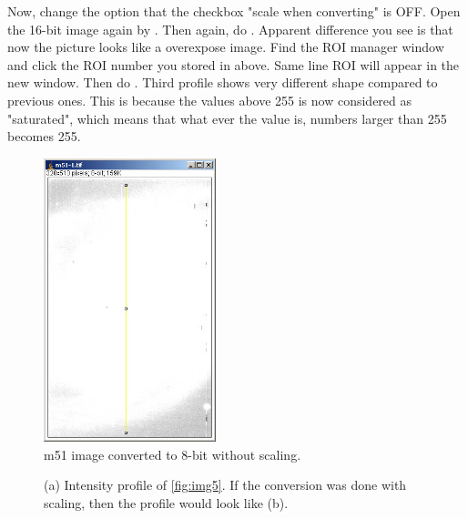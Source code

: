 \begin{indentexercise}{1}
Now, change the option  that the checkbox "scale when
converting" is OFF. Open the 16-bit image again by
. Then
again, do .
Apparent difference you see is that now the picture looks like a
overexpose image. Find the ROI manager window and click the ROI number
you stored in above. Same line ROI will appear in the new window. Then
do . Third profile
shows very different shape compared to previous ones. This is because
the values above 255 is now considered as
"saturated", which means that what ever the
value is, numbers larger than 255 becomes 255.

\begin{figure}[H]
\begin{center}
\includegraphics[width=5cm]{img/CMCIBasicCourse201102-img9.jpg}
\caption{ m51 image converted to 8-bit without scaling.}
\label{fig:img9}
\end{center}
\end{figure}

\begin{figure}[H]
\centering
{}
\caption{ (a) Intensity profile of \ref{fig:img5}. If the conversion was done with scaling, then the profile would look like (b). }
\label{fig:8bitConverted}
\end{figure} 

\end{indentexercise}

